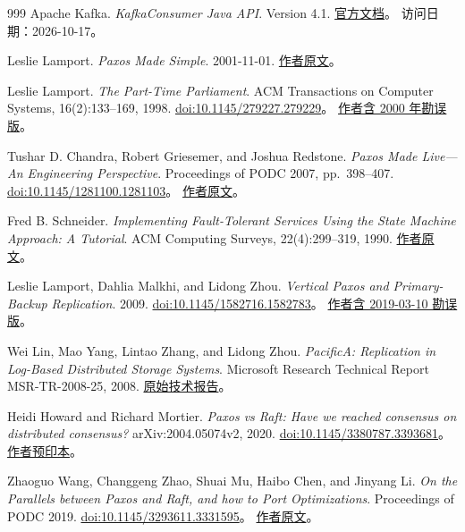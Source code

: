 \begin{thebibliography}{999}
Apache Kafka.
\textit{KafkaConsumer Java API}. Version 4.1.
\href{https://kafka.apache.org/41/javadoc/org/apache/kafka/clients/consumer/KafkaConsumer.html}{官方文档}。
访问日期：2026-10-17。

Leslie Lamport.
\textit{Paxos Made Simple}. 2001-11-01.
\href{https://lamport.azurewebsites.net/pubs/paxos-simple.pdf}{作者原文}。

Leslie Lamport.
\textit{The Part-Time Parliament}.
ACM Transactions on Computer Systems, 16(2):133--169, 1998.
\href{https://doi.org/10.1145/279227.279229}{doi:10.1145/279227.279229}。
\href{https://lamport.azurewebsites.net/pubs/lamport-paxos.pdf}{作者含 2000 年勘误版}。

Tushar D. Chandra, Robert Griesemer, and Joshua Redstone.
\textit{Paxos Made Live---An Engineering Perspective}.
Proceedings of PODC 2007, pp.\ 398--407.
\href{https://doi.org/10.1145/1281100.1281103}{doi:10.1145/1281100.1281103}。
\href{https://static.googleusercontent.com/media/research.google.com/en//archive/paxos_made_live.pdf}{作者原文}。

Fred B. Schneider.
\textit{Implementing Fault-Tolerant Services Using the State Machine Approach: A Tutorial}.
ACM Computing Surveys, 22(4):299--319, 1990.
\href{https://www.cs.cornell.edu/fbs/publications/SMSurvey.pdf}{作者原文}。

Leslie Lamport, Dahlia Malkhi, and Lidong Zhou.
\textit{Vertical Paxos and Primary-Backup Replication}. 2009.
\href{https://doi.org/10.1145/1582716.1582783}{doi:10.1145/1582716.1582783}。
\href{https://lamport.azurewebsites.net/pubs/vertical-paxos.pdf}{作者含 2019-03-10 勘误版}。

Wei Lin, Mao Yang, Lintao Zhang, and Lidong Zhou.
\textit{PacificA: Replication in Log-Based Distributed Storage Systems}.
Microsoft Research Technical Report MSR-TR-2008-25, 2008.
\href{https://www.microsoft.com/en-us/research/wp-content/uploads/2008/02/tr-2008-25.pdf}{原始技术报告}。

Heidi Howard and Richard Mortier.
\textit{Paxos vs Raft: Have we reached consensus on distributed consensus?}
arXiv:2004.05074v2, 2020.
\href{https://doi.org/10.1145/3380787.3393681}{doi:10.1145/3380787.3393681}。
\href{https://arxiv.org/pdf/2004.05074}{作者预印本}。

Zhaoguo Wang, Changgeng Zhao, Shuai Mu, Haibo Chen, and Jinyang Li.
\textit{On the Parallels between Paxos and Raft, and how to Port Optimizations}.
Proceedings of PODC 2019.
\href{https://doi.org/10.1145/3293611.3331595}{doi:10.1145/3293611.3331595}。
\href{https://ipads.se.sjtu.edu.cn/zh/publications/WangPODC19.pdf}{作者原文}。


\end{thebibliography}
